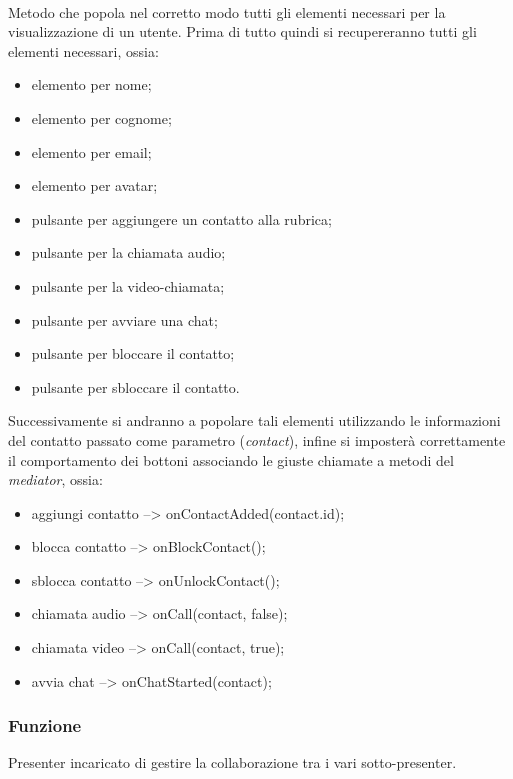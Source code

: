 \begin{description}
\item{}\\
Metodo che popola nel corretto modo tutti gli elementi necessari per la visualizzazione di un utente. Prima di tutto quindi si recupereranno tutti gli elementi necessari, ossia:
\begin{itemize}
\item elemento per nome;
\item elemento per cognome;
\item elemento per email;
\item elemento per avatar;
\item pulsante per aggiungere un contatto alla rubrica;
\item pulsante per la chiamata audio;
\item pulsante per la video-chiamata;
\item pulsante per avviare una chat;
\item pulsante per bloccare il contatto;
\item pulsante per sbloccare il contatto.
\end{itemize}
Successivamente si andranno a popolare tali elementi utilizzando le informazioni del contatto passato come parametro (\textit{contact}), infine si imposterà correttamente il comportamento dei bottoni associando le giuste chiamate a metodi del \textit{mediator}, ossia:
\begin{itemize}
\item aggiungi contatto --> onContactAdded(contact.id);
\item blocca contatto --> onBlockContact();
\item sblocca contatto --> onUnlockContact();
\item chiamata audio --> onCall(contact, false);
\item chiamata video --> onCall(contact, true);
\item avvia chat --> onChatStarted(contact);
\end{itemize}

\end{description}


\subsubsection*{Funzione}
Presenter incaricato di gestire la collaborazione tra i vari sotto-presenter.

